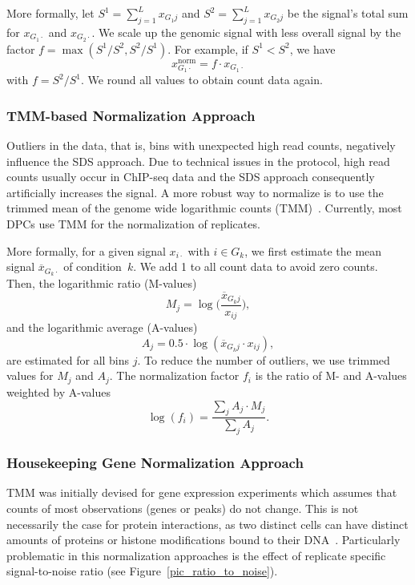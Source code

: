 \noindent
More formally, let $S^1 = \sum_{j=1}^{L} x_{G_1j}$ and  $S^2 = \sum_{j=1}^{L} x_{G_2j}$ be the signal's total sum for $x_{G_1\cdot}$ and $x_{G_2\cdot}$.
We scale up the genomic signal with less overall signal by the factor $f = \max(S^1/S^2, S^2/S^1)$.
For example, if $S^1 < S^2$, we have 
$$x_{G_1\cdot}^{\text{norm}} = f \cdot x_{G_1\cdot}$$
with $f = S^2/S^1.$
We round all values to obtain count data again.%




\subsubsection{TMM-based Normalization Approach}
Outliers in the data, that is, bins with unexpected high read counts, negatively influence the SDS approach.
Due to technical issues in the protocol, high read counts usually occur in ChIP-seq data and the SDS approach consequently artificially increases the signal.
A more robust way to normalize is to use the trimmed mean of the genome wide logarithmic counts (TMM)~\citep{Robinson2010norm}.
Currently, most DPCs use TMM for the normalization of replicates. 

More formally, for a given signal $x_{i\cdot}$ with $i \in G_k$, we first estimate the mean signal $\overline{x}_{G_k\cdot}$ of condition~$k$. 
We add 1 to all count data to avoid zero counts.
Then, the logarithmic ratio (M-values) 
$$M_j = \log\bigg(\frac{\overline{x}_{G_kj}}{x_{ij}}\bigg), $$
\noindent
and the logarithmic average (A-values)
$$A_j = 0.5 \cdot \log(\overline{x}_{G_kj} \cdot x_{ij}),$$
are estimated for all bins $j$.
To reduce the number of outliers, we use trimmed values for $M_j$ and $A_j$.
The normalization factor $f_i$ is the ratio of M- and A-values weighted by A-values
$$\log(f_i) = \frac{\sum_j A_j \cdot M_j}{\sum_j A_j}.$$


\subsubsection{Housekeeping Gene Normalization Approach}
TMM was initially devised for gene expression experiments which assumes that counts of most observations (genes or peaks) do not change. 
This is not necessarily the case for protein interactions, as two distinct cells can have distinct amounts of proteins or histone modifications bound to their DNA~\citep{Meyer2014}. 
Particularly problematic in this normalization approaches is the effect of replicate specific signal-to-noise ratio (see Figure~\ref{pic_ratio_to_noise}). 

